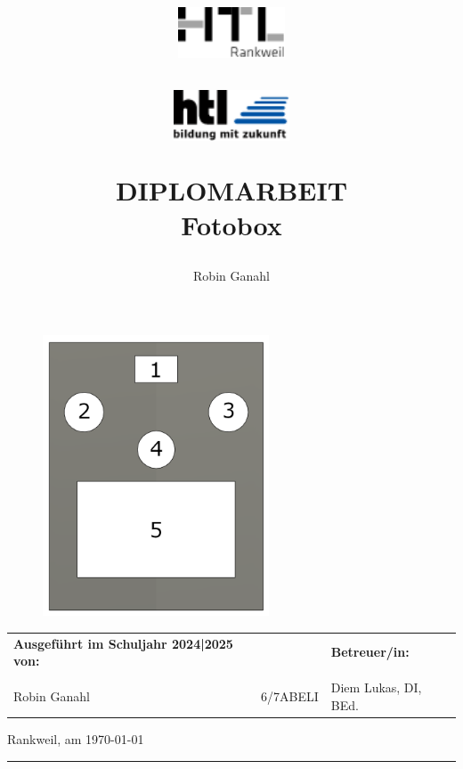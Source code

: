 \documentclass[12pt, a4paper]{article}
\author{Robin Ganahl}
\title{
  \vspace*{-2cm} %
  \begin{center}
    \begin{minipage}[t]{0.3\textwidth}
      \includegraphics[height=1.5cm]{main/Logo1.png}
    \end{minipage}
    \hfill
    \raisebox{1.2cm}{ %
      \begin{minipage}[t]{0.3\textwidth}
        \raggedright
        \small
        \textbf{\Large HTBLuVA Rankweil} \\
        Höhere Lehranstalt für \\
        Elektronik und Technische Informatik
      \end{minipage}
    }
    \hfill
    \begin{minipage}[t]{0.3\textwidth}
      \flushright
      \includegraphics[height=1.5cm]{main/Logo2.png}
    \end{minipage}
  \end{center}
  \vspace{1.5cm} %
  \begin{center}
    \textbf{\LARGE DIPLOMARBEIT} \\ [0.5em]
    \Large Fotobox
  \end{center}
}
\date{} %
\begin{document}
\maketitle

\vspace{-3cm}

\begin{figure}[H]
  \centering
  \includegraphics[width=0.6\textwidth]{images/mechanics/fotobox_frontplatte_v2.png}
\end{figure}

\thispagestyle{empty}  %

\begin{table}[h!]
    \centering
    \begin{tabular}{l l l}
        \textbf{Ausgeführt im Schuljahr 2024|2025 von:} & & \textbf{Betreuer/in:} \\ 
        \\
        Robin Ganahl & 6/7ABELI & Diem Lukas, DI, BEd. \\ 
    \end{tabular}
\end{table}

\vspace{0.5cm} %
Rankweil, am \today
\\
\rule{\linewidth}{0.4mm}  %
\end{document}
